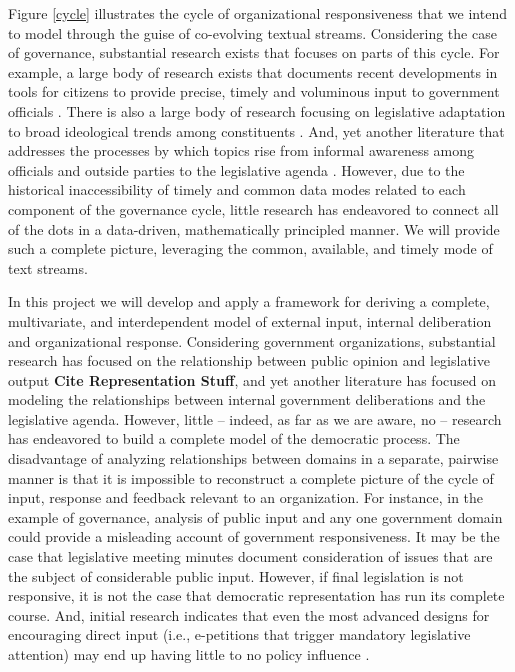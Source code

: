 Figure \ref{cycle} illustrates the cycle of organizational responsiveness that we intend to model through the guise of co-evolving textual streams. Considering the case of governance, substantial research exists that focuses on parts of this cycle. For example, a large body of research exists that documents recent developments in tools for citizens to provide precise, timely and voluminous input to government officials  \cite{Yildiz2007}. There is also a large body of research focusing on legislative adaptation to broad ideological trends among constituents \cite{Canes-Wrone2002}.  And, yet another literature that addresses the processes by which topics rise from informal awareness among officials and outside parties to the legislative agenda \cite{Baumgartner1993}. However, due to the historical inaccessibility of timely and common data modes related to each component of the governance cycle, little research has endeavored to connect all of the dots in a data-driven, mathematically principled manner. We will provide such a complete picture, leveraging the common, available, and timely mode of text streams.


In this project we will develop and apply a framework for deriving a complete, multivariate, and interdependent model of external input, internal deliberation and organizational response. Considering government organizations, substantial research has focused on the relationship between public opinion and legislative output {\bf Cite Representation Stuff}, and yet another literature has focused on modeling the relationships between internal government deliberations and the legislative agenda. However, little -- indeed, as far as we are aware, no -- research has endeavored to build a complete model of the democratic process. The disadvantage of analyzing relationships between domains in a separate, pairwise manner is that it is impossible to reconstruct a complete picture of the cycle of input, response and feedback relevant to an organization.  For instance, in the example of governance, analysis of public input and any one government domain could provide a misleading account of government responsiveness. It may be the case that legislative meeting minutes document consideration of issues that are the subject of considerable public input. However, if final legislation is not responsive, it is not the case that democratic representation has run its complete course. And, initial research indicates that even the most advanced designs for encouraging direct input (i.e., e-petitions that trigger mandatory legislative attention) may end up having little to no policy influence \cite{Hough2012}.

